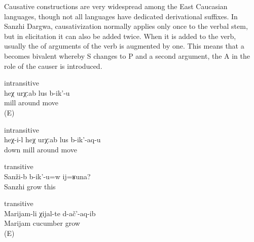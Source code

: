 Causative constructions are very widespread among the East Caucasian languages, though not all languages have dedicated derivational suffixes. In Sanzhi Dargwa, causativization normally applies only once to the verbal stem, but in elicitation it can also be added twice. When it is added to the verb, usually the  of arguments of the verb is augmented by one. This means that a  becomes bivalent whereby S changes to P and a second argument, the  A in the role of the causer is introduced. 
%
\begin{exe}
	\ex	\label{ex:This mill spins around} intransitive \\
	\gll	heχ	urχːab	lus	b-ik'-u\\
			mill	around	move\\
	\glt	{} (E)


	\ex	\label{ex:This makes the mill spin around} intransitive \\
	\gll	heχ-i-l	heχ	urχːab	lus	b-ik'-aq-u\\
			down	mill	around	move\\
	\glt	{}

	\ex	\label{ex:‎‎Something like this grows in Sanzhi} transitive \\
	\gll	Sanži-b	b-ik'-u=w	ij=ʁuna?\\
		Sanzhi	grow	this\\
	\glt	{}
	
	\ex	\label{ex:‎Marijam was growing cucumbers} transitive \\
	\gll	Marijam-li	χijal-te	d-ač'-aq-ib\\
		Marijam	cucumber	grow\\
	\glt	{} (E)
\end{exe}

